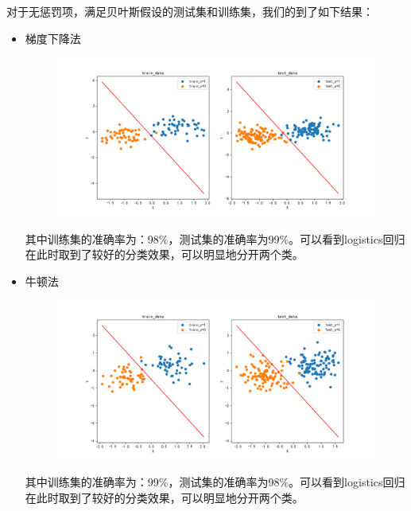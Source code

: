 \documentclass[lang=cn,a4paper,cite=authoryear]{elegantpaper}
\begin{document}
\subsubsection*{}
对于无惩罚项，满足贝叶斯假设的测试集和训练集，我们的到了如下结果：
\begin{itemize}
	\par
	\item 梯度下降法
	\begin{center}
		\begin{figure}[H]
			\centering
			\includegraphics[scale=0.5]{test03}
		\end{figure}
	\end{center}
	其中训练集的准确率为：98\%，测试集的准确率为99\%。可以看到logistics回归在此时取到了较好的分类效果，可以明显地分开两个类。
	\par
	\item 牛顿法
	\begin{center}
		\begin{figure}[H]
			\centering
			\includegraphics[scale=0.5]{nttest03}
		\end{figure}
	\end{center}
	其中训练集的准确率为：99\%，测试集的准确率为98\%。可以看到logistics回归在此时取到了较好的分类效果，可以明显地分开两个类。

\end{itemize}
\end{document}
